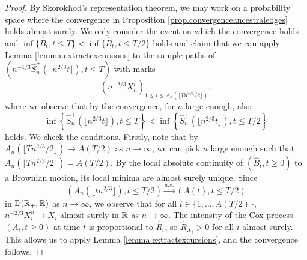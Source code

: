 \begin{proof}
 By Skorokhod's representation theorem, we may work on a probability space where the convergence in Proposition \ref{prop.convergenceancestraledges} holds almost surely. We only consider the event on which the convergence holds and $\inf\{\hat{B}_t, t\leq T\}<\inf\{\hat{B}_t, t\leq T/2\}$ holds and claim that we can apply Lemma \ref{lemma.extractexcursions} to the sample paths of $\left(n^{-1/3}\hat{S}^{+}_n\left(\lfloor n^{2/3}t\rfloor\right),t \leq T\right)$ with marks $$\left(n^{-2/3}X_n^i\right)_{1\leq i\leq A_n\left(\lfloor T n^{2/3}/2\rfloor\right)},$$ where we observe that by the convergence, for $n$ large enough, also $$\inf\left\{\hat{S}^{+}_n\left(\lfloor n^{2/3}t\rfloor\right), t\leq T\right\}<\inf\left\{\hat{S}^{+}_n\left(\lfloor n^{2/3}t\rfloor\right), t\leq T/2\right\}$$ holds.  We check the conditions.
Firstly, note that by $A_n\left(\lfloor T n^{2/3}/2\rfloor\right)\to A\left(T/2\right)$ as $n\to \infty$, we can pick $n$ large enough such that $A_n\left(\lfloor T n^{2/3}/2\rfloor\right)=A\left(T/2\right)$. By the local absolute continuity of $(\hat{B}_t,t\geq 0)$ to a Brownian motion, its local minima are almost surely unique. Since
$$\left(A_n\left(\lfloor t n^{2/3}\rfloor\right), t\leq T/2\right) \overset{a.s.}{\to}\left(A\left(t\right),t\leq T/2\right)$$
in ${\mathbb D}({\mathbb R}_+,{\mathbb R})$ as $n\to \infty$, we observe that for all $i\in \{1,\dots,A(T/2)\}$, $n^{-2/3}X_i^n\to X_i$ almost surely in ${\mathbb R}$ as $n\to \infty$. The intensity of the Cox process $(A_t,t\geq 0)$ at time $t$ is proportional to $\hat{R}_t$, so $\hat{R}_{X_i}>0$ for all $i$ almost surely. This allows us to apply Lemma \ref{lemma.extractexcursions}, and the convergence follows.
\end{proof}

